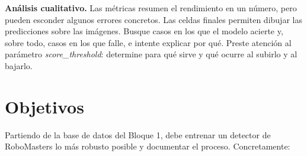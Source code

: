 \documentclass[12pt,a4paper]{article}
\begin{document}
\textbf{Análisis cualitativo.} Las métricas resumen el rendimiento en un número, pero pueden esconder algunos errores concretos. Las celdas finales permiten dibujar las predicciones sobre las imágenes. Busque casos en los que el modelo acierte y, sobre todo, casos en los que falle, e intente explicar por qué. Preste atención al parámetro \textit{score\_threshold}: determine para qué sirve y qué ocurre al subirlo y al bajarlo.


\section{Objetivos}
\label{sec:semana2-objetivos}

Partiendo de la base de datos del Bloque 1, debe entrenar un detector de RoboMasters lo más robusto posible y documentar el proceso. Concretamente:
\end{document}
